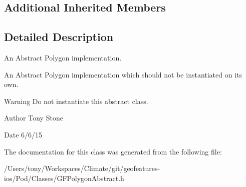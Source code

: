 \subsection*{Additional Inherited Members}


\subsection{Detailed Description}
An Abstract Polygon implementation. 

An Abstract Polygon implementation which should not be instantiated on it\textquotesingle{}s own.

\begin{DoxyWarning}{Warning}
Do not instantiate this abstract class.
\end{DoxyWarning}
\begin{DoxyAuthor}{Author}
Tony Stone 
\end{DoxyAuthor}
\begin{DoxyDate}{Date}
6/6/15 
\end{DoxyDate}


The documentation for this class was generated from the following file\+:\begin{DoxyCompactItemize}
\item 
/\+Users/tony/\+Workspaces/\+Climate/git/geofeatures-\/ios/\+Pod/\+Classes/G\+F\+Polygon\+Abstract.\+h\end{DoxyCompactItemize}
